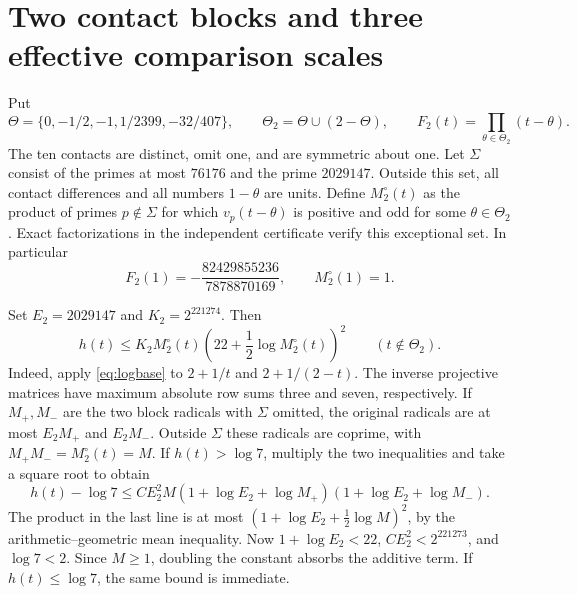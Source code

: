 \documentclass[11pt,a4paper]{article}
\begin{document}
\section{Two contact blocks and three effective comparison scales}
Put
\[
 \Theta=\{0,-1/2,-1,1/2399,-32/407\},\qquad
 \Theta_2=\Theta\cup(2-\Theta),\qquad
 F_2(t)=\prod_{\theta\in\Theta_2}(t-\theta).
\]
The ten contacts are distinct, omit one, and are symmetric about one.
Let $\Sigma$ consist of the primes at most $76176$ and the prime
$2029147$. Outside this set, all contact differences and all numbers
$1-\theta$ are units. Define $M_2^\circ(t)$ as the product of primes
$p\notin\Sigma$ for which $v_p(t-\theta)$ is positive and odd for
some $\theta\in\Theta_2$. Exact factorizations in the independent
certificate verify this exceptional set. In particular
\[
 F_2(1)=-\frac{82429855236}{7878870169},\qquad M_2^\circ(1)=1.
\]

Set $E_2=2029147$ and $K_2=2^{221274}$. Then
\begin{equation}\label{eq:contactheight}
 h(t)\le K_2M_2^\circ(t)
              \left(22+\frac12\log M_2^\circ(t)\right)^2
                   \qquad(t\notin\Theta_2).
\end{equation}
Indeed, apply \eqref{eq:logbase} to $2+1/t$ and $2+1/(2-t)$.
The inverse projective matrices have maximum absolute row sums three
and seven, respectively. If $M_+,M_-$ are the two block radicals
with $\Sigma$ omitted, the original radicals are at most $E_2M_+$
and $E_2M_-$. Outside $\Sigma$ these radicals are coprime, with
$M_+M_-=M_2^\circ(t)=M$. If $h(t)>\log7$, multiply the two
inequalities and take a square root to obtain
\[
 h(t)-\log7\le CE_2^2M
 (1+\log E_2+\log M_+)(1+\log E_2+\log M_-).
\]
The product in the last line is at most
$(1+\log E_2+\tfrac12\log M)^2$, by the arithmetic--geometric
mean inequality. Now $1+\log E_2<22$, $CE_2^2<2^{221273}$,
and $\log7<2$. Since $M\ge1$, doubling the constant absorbs the
additive term. If $h(t)\le\log7$, the same bound is immediate.
\end{document}
